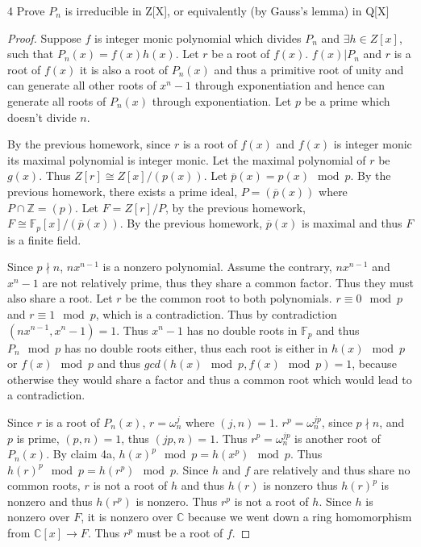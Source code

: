 \documentclass{article}
\newcommand{\C}{\mathbb{C}}
\newcommand{\Z}{\mathbb{Z}}
\newcommand{\F}{\mathbb{F}}
\begin{document}
\begin{PROB}{4}\label{Problem 4.}
    Prove $P_n$ is irreducible in Z[X], or equivalently (by Gauss's lemma) in Q[X]
\end{PROB}
\begin{proof}
    Suppose $f$ is integer monic polynomial which divides $P_n$  and $\exists h \in Z[x]$, such that $P_n(x) = f(x)h(x)$. Let $r$ be a root of $f(x)$. $f(x) | P_n$ and $r$ is a root of $f(x)$ it is also a root of $P_n(x)$ and thus a primitive root of unity and can generate all other roots of $x^n - 1$ through exponentiation and hence can generate all roots of $P_n(x)$ through exponentiation. Let $p$ be a prime which doesn't divide $n$. 
    
    
    By the previous homework, since $r$ is a root of $f(x)$ and $f(x)$ is integer monic its maximal polynomial is integer monic. Let the maximal polynomial of $r$ be $g(x)$. Thus $Z[r] \cong Z[x] / (p(x))$. Let $\overline{p}(x) = p(x) \mod p$. By the previous homework, there exists a prime ideal, $P = (\overline{p}(x))$ where $P \cap \Z = (p)$. Let $F = Z[r] / P$, by the previous homework, $F \cong \F_p[x] / (\overline{p}(x))$. By the previous homework, $\overline{p}(x)$ is maximal and thus $F$ is a finite field. 
    
    Since $p \nmid n$, $nx^{n - 1}$ is a nonzero polynomial. Assume the contrary, $nx^{n - 1}$ and $x^n - 1$ are not relatively prime, thus they share a common factor. Thus they must also share a root. Let $r$ be the common root to both polynomials. $r \equiv 0 \mod p$ and $r \equiv 1 \mod p$, which is a contradiction. Thus by contradiction $(nx^{n - 1}, x^n - 1) = 1$. Thus $x^n - 1$ has no double roots in $\F_p$ and thus $P_n \mod p$ has no double roots either, thus each root is either in $h(x) \mod p$ or $f(x) \mod p$ and thus $gcd(h(x) \mod p, f(x) \mod p) = 1$, because otherwise they would share a factor and thus a common root which would lead to a contradiction. 
    
    Since $r$ is a root of $P_n(x)$, $r = \omega_n^{j}$ where $(j, n) =1$. $r^p = \omega_n^{jp}$, since $p \nmid n$, and $p$ is prime, $(p, n) = 1$, thus $(jp, n) = 1$. Thus $r^p = \omega_n^{jp}$ is another root of $P_n(x)$. By claim 4a, $h(x)^p \mod p = h(x^p) \mod p$. Thus $h(r)^p \mod p = h(r^p) \mod p$. Since $h$ and $f$ are relatively and thus share no common roots, $r$ is not a root of $h$ and thus $h(r)$ is nonzero thus $h(r)^p$ is nonzero and thus $h(r^p)$ is nonzero. Thus $r^p$ is not a root of $h$. Since $h$ is nonzero over $F$, it is nonzero over $\C$ because we went down a ring homomorphism from $\C[x] \to F$. Thus $r^p$ must be a root of $f$. 
    

\end{proof}
\end{document}

